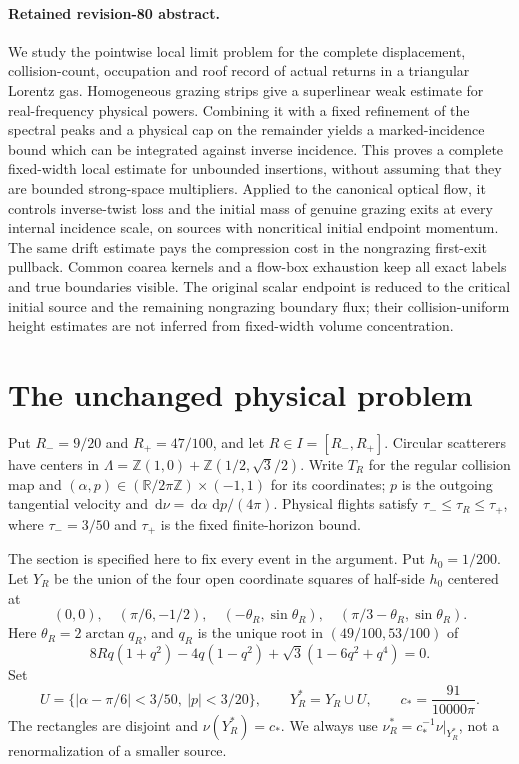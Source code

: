 \documentclass[11pt,reqno]{amsart}
\numberwithin{equation}{section}
\theoremstyle{definition}\newtheorem{definition}[theorem]{Definition}
\theoremstyle{remark}\newtheorem{remark}[theorem]{Remark}
\newcommand{\R}{\mathbb R}\newcommand{\Z}{\mathbb Z}\newcommand{\T}{\mathbb T}
\newcommand{\dd}{\,\mathrm d}\newcommand{\one}{\mathbf1}
\theoremstyle{definition}\newtheorem{inputstatement}[theorem]{Input statement}
\begin{document}
\paragraph{Retained revision-80 abstract.}

We study the pointwise local limit problem for the complete displacement,
collision-count, occupation and roof record of actual returns in a
triangular Lorentz gas. Homogeneous grazing strips give a superlinear
weak estimate for real-frequency physical powers. Combining it with
a fixed refinement of the spectral peaks and a physical cap on the
remainder yields a marked-incidence bound which can be integrated
against inverse incidence. This proves a complete fixed-width local
estimate for unbounded insertions, without assuming that they are
bounded strong-space multipliers. Applied to the canonical optical
flow, it controls inverse-twist loss and the initial mass of genuine
grazing exits at every internal incidence scale, on sources with
noncritical initial endpoint momentum. The same drift estimate pays
the compression cost in the nongrazing first-exit pullback. Common
coarea kernels and a flow-box exhaustion keep all exact labels and
true boundaries visible. The original scalar endpoint is reduced to
the critical initial source and the remaining nongrazing boundary
flux; their collision-uniform height estimates are not inferred from
fixed-width volume concentration.



\section{The unchanged physical problem}
Put $R_-=9/20$ and $R_+=47/100$, and let $R\in I=[R_-,R_+]$. Circular scatterers have centers in
$\Lambda=\Z(1,0)+\Z(1/2,\sqrt3/2)$. Write $T_R$ for the regular
collision map and $(\alpha,p)\in(\R/2\pi\Z)\times(-1,1)$ for its
coordinates; $p$ is the outgoing tangential velocity and
$\dd\nu=\dd\alpha\,\dd p/(4\pi)$. Physical flights satisfy
$\tau_-\le\tau_R\le\tau_+$, where $\tau_-=3/50$ and $\tau_+$
is the fixed finite-horizon bound.

The section is specified here to fix every event in the argument.
Put $h_0=1/200$. Let $Y_R$ be the union of the four open coordinate
squares of half-side $h_0$ centered at
\[
 (0,0),\quad(\pi/6,-1/2),\quad
 (-\theta_R,\sin\theta_R),\quad
 (\pi/3-\theta_R,\sin\theta_R).
\]
Here $\theta_R=2\arctan q_R$, and $q_R$ is the unique root in
$(49/100,53/100)$ of
\[
 8Rq(1+q^2)-4q(1-q^2)+\sqrt3(1-6q^2+q^4)=0.
\]
Set
\[
 U=\{|\alpha-\pi/6|<3/50,\ |p|<3/20\},\qquad
 Y_R^*=Y_R\cup U,\qquad c_*=\frac{91}{10000\pi}.
\]
The rectangles are disjoint and $\nu(Y_R^*)=c_*$. We always use
$\nu_R^*=c_*^{-1}\nu|_{Y_R^*}$, not a renormalization of a smaller
source.
\end{document}
